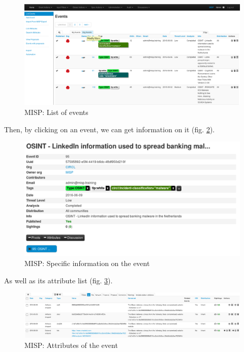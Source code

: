 \documentclass{eplmastersthesis}
\begin{document}
\begin{figure}[!h]
	\begin{center}
		\includegraphics[scale=0.32]{res/webEvents}
		\caption{MISP: List of events}
		\label{webevents}
	\end{center}
\end{figure}


Then, by clicking on an event, we can get information on it (fig. \ref{webevent}).


\begin{figure}[!h]
	\begin{center}
		\includegraphics[scale=0.35]{res/webEvent}
		\caption{MISP: Specific information on the event}
		\label{webevent}
	\end{center}
\end{figure}


As well as its attribute list (fig. \ref{webattributes}).
\begin{figure}[!h]
	\begin{center}
		\includegraphics[scale=0.35]{res/webAttributes}
		\caption{MISP: Attributes of the event}
		\label{webattributes}
	\end{center}
\end{figure}
\end{document}
